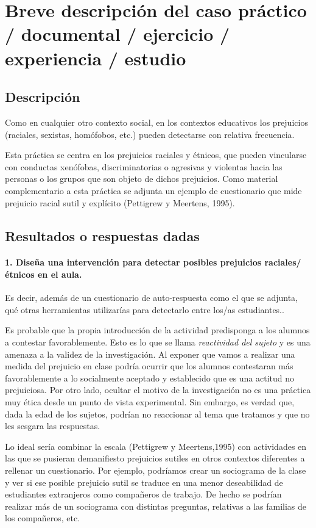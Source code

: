 \documentclass[palatino,nochap]{apuntesURJC}
\begin{document}
\section{Breve descripción del caso práctico / documental / ejercicio / experiencia / estudio}

\subsection{Descripción}

Como en cualquier otro contexto social, en los contextos educativos los
prejuicios (raciales, sexistas, homófobos, etc.) pueden detectarse con relativa
frecuencia.

Esta práctica se centra en los prejuicios raciales y étnicos, que pueden
vincularse con conductas xenófobas, discriminatorias o agresivas y violentas
hacia las personas o los grupos que son objeto de dichos prejuicios.
Como material complementario a esta práctica se adjunta un ejemplo de
cuestionario que mide prejuicio racial sutil y explícito (Pettigrew y Meertens,
1995).


\subsection{Resultados o respuestas dadas}

\paragraph{1. Diseña una intervención para detectar posibles prejuicios raciales/étnicos en el aula.} Es decir, además de un cuestionario de auto-respuesta como el que se adjunta, qué otras herramientas utilizarías para detectarlo entre los/as estudiantes..

Es probable que la propia introducción de la actividad predisponga a los alumnos a contestar favorablemente. 
%
Esto es lo que se llama \textit{reactividad del sujeto} y es una amenaza a la validez de la investigación. 
%
Al exponer que vamos a realizar una medida del prejuicio en clase podría ocurrir que los alumnos contestaran más favorablemente a lo socialmente aceptado y establecido que es una actitud no prejuiciosa.
%
Por otro lado, ocultar el motivo de la investigación no es una práctica muy ética desde un punto de vista experimental.
%
Sin embargo, es verdad que, dada la edad de los sujetos, podrían no reaccionar al tema que tratamos y que no les sesgara las respuestas.

Lo ideal sería combinar la  escala (Pettigrew y Meertens,1995)  con actividades en las que se pusieran demanifiesto prejuicios sutiles en otros contextos diferentes a rellenar un cuestionario. 
%
Por ejemplo, podríamos crear un sociograma de la clase y ver si ese posible prejuicio sutil se traduce en una menor deseabilidad de estudiantes extranjeros como compañeros de trabajo.
%
De hecho se podrían realizar más de un sociograma con distintas preguntas, relativas a las familias de los compañeros, etc.
\end{document}
